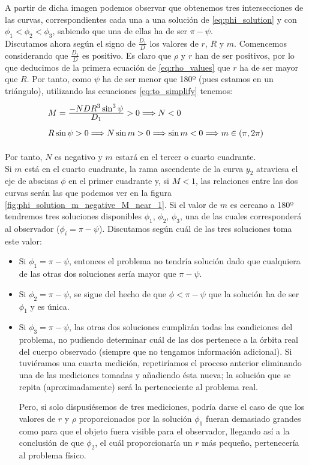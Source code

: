 \documentclass[11pt]{book}
\newcommand\ddfrac[2]{\frac{\displaystyle #1}{\displaystyle #2}}
\begin{document}
A partir de dicha imagen podemos observar que obtenemos tres intersecciones de las curvas, correspondientes cada una a una solución de \eqref{eq:phi_solution} y con $\phi_1<\phi_2<\phi_3$, sabiendo que una de ellas ha de ser $\pi-\psi$.\\

Discutamos ahora según el signo de $\frac{D_1}{D}$ los valores de $r$, $R$ y $m$. Comencemos considerando que $\frac{D_1}{D}$ es positivo. Es claro que $\rho$ y $r$ han de ser positivos, por lo que deducimos de la primera ecuación de \eqref{eq:rho_values} que $r$ ha de ser mayor que $R$. Por tanto, como $\psi$ ha de ser menor que 180º (pues estamos en un triángulo), utilizando las ecuaciones \eqref{eq:to_simplify} tenemos:
\[
\def\arraystretch{2}
\begin{array}{l}
M=\ddfrac{-NDR^3\sin^3{\psi}}{D_1}>0 \Longrightarrow N<0 \\
R\sin{\psi}>0 \Longrightarrow N\sin{m}>0 \Longrightarrow \sin{m}<0 \Longrightarrow m\in(\pi,2\pi)
\end{array}
\]

Por tanto, $N$ es negativo y $m$ estará en el tercer o cuarto cuadrante.\\

Si $m$ está en el cuarto cuadrante, la rama ascendente de la curva $y_2$ atraviesa el eje de abscisas $\phi$ en el primer cuadrante y, si $M<1$, las relaciones entre las dos curvas serán las que podemos ver en la figura \ref{fig:phi_solution_m_negative_M_near_1}. Si el valor de $m$ es cercano a 180º tendremos tres soluciones disponibles $\phi_1$, $\phi_2$, $\phi_3$, una de las cuales corresponderá al observador ($\phi_i=\pi-\psi$). Discutamos según cuál de las tres soluciones toma este valor:
\begin{itemize}
\item Si $\phi_1=\pi-\psi$, entonces el problema no tendría solución dado que cualquiera de las otras dos soluciones sería mayor que $\pi-\psi$.
\item Si $\phi_2=\pi-\psi$, se sigue del hecho de que $\phi<\pi-\psi$ que la solución ha de ser $\phi_1$ y es única.
\item Si $\phi_3=\pi-\psi$, las otras dos soluciones cumplirán todas las condiciones del problema, no pudiendo determinar cuál de las dos pertenece a la órbita real del cuerpo observado (siempre que no tengamos información adicional). Si tuviéramos una cuarta medición, repetiríamos el proceso anterior eliminando una de las mediciones tomadas y añadiendo ésta nueva; la solución que se repita (aproximadamente) será la perteneciente al problema real.

Pero, si solo dispusiésemos de tres mediciones, podría darse el caso de que los valores de $r$ y $\rho$ proporcionados por la solución $\phi_1$ fueran demasiado grandes como para que el objeto fuera visible para el observador, llegando así a la conclusión de que $\phi_2$, el cuál proporcionaría un $r$ más pequeño, pertenecería al problema físico.
\end{itemize} 
\end{document}
